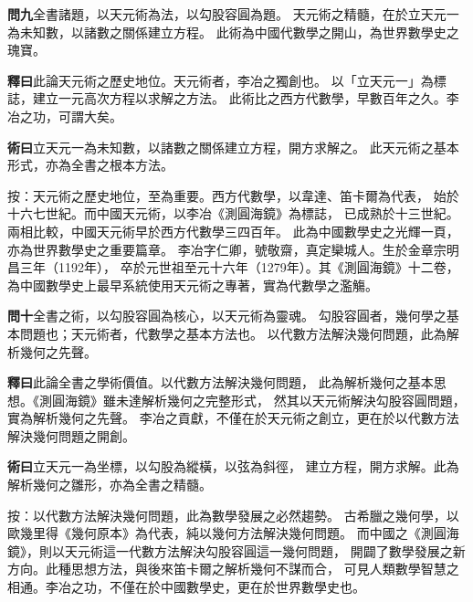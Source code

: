 \documentclass[12pt,a4paper]{article}
\begin{document}
\noindent\textbf{問九}\quad 全書諸題，以天元術為法，以勾股容圓為題。
天元術之精髓，在於立天元一為未知數，以諸數之關係建立方程。
此術為中國代數學之開山，為世界數學史之瑰寶。

\vspace{0.3em}

\noindent\textbf{釋曰}\quad 此論天元術之歷史地位。天元術者，李冶之獨創也。
以「立天元一」為標誌，建立一元高次方程以求解之方法。
此術比之西方代數學，早數百年之久。李冶之功，可謂大矣。

\vspace{0.3em}

\noindent\textbf{術曰}\quad 立天元一為未知數，以諸數之關係建立方程，開方求解之。
此天元術之基本形式，亦為全書之根本方法。

\vspace{0.3em}

\noindent
按：天元術之歷史地位，至為重要。西方代數學，以韋達、笛卡爾為代表，
始於十六七世紀。而中國天元術，以李冶《測圓海鏡》為標誌，
已成熟於十三世紀。兩相比較，中國天元術早於西方代數學三四百年。
此為中國數學史之光輝一頁，亦為世界數學史之重要篇章。
李冶字仁卿，號敬齋，真定欒城人。生於金章宗明昌三年（1192年），
卒於元世祖至元十六年（1279年）。其《測圓海鏡》十二卷，
為中國數學史上最早系統使用天元術之專著，實為代數學之濫觴。

\vspace{0.5em}

\noindent\textbf{問十}\quad 全書之術，以勾股容圓為核心，以天元術為靈魂。
勾股容圓者，幾何學之基本問題也；天元術者，代數學之基本方法也。
以代數方法解決幾何問題，此為解析幾何之先聲。

\vspace{0.3em}

\noindent\textbf{釋曰}\quad 此論全書之學術價值。以代數方法解決幾何問題，
此為解析幾何之基本思想。《測圓海鏡》雖未達解析幾何之完整形式，
然其以天元術解決勾股容圓問題，實為解析幾何之先聲。
李冶之貢獻，不僅在於天元術之創立，更在於以代數方法解決幾何問題之開創。

\vspace{0.3em}

\noindent\textbf{術曰}\quad 立天元一為坐標，以勾股為縱橫，以弦為斜徑，
建立方程，開方求解。此為解析幾何之雛形，亦為全書之精髓。

\vspace{0.3em}

\noindent
按：以代數方法解決幾何問題，此為數學發展之必然趨勢。
古希臘之幾何學，以歐幾里得《幾何原本》為代表，純以幾何方法解決幾何問題。
而中國之《測圓海鏡》，則以天元術這一代數方法解決勾股容圓這一幾何問題，
開闢了數學發展之新方向。此種思想方法，與後來笛卡爾之解析幾何不謀而合，
可見人類數學智慧之相通。李冶之功，不僅在於中國數學史，更在於世界數學史也。
\end{document}

